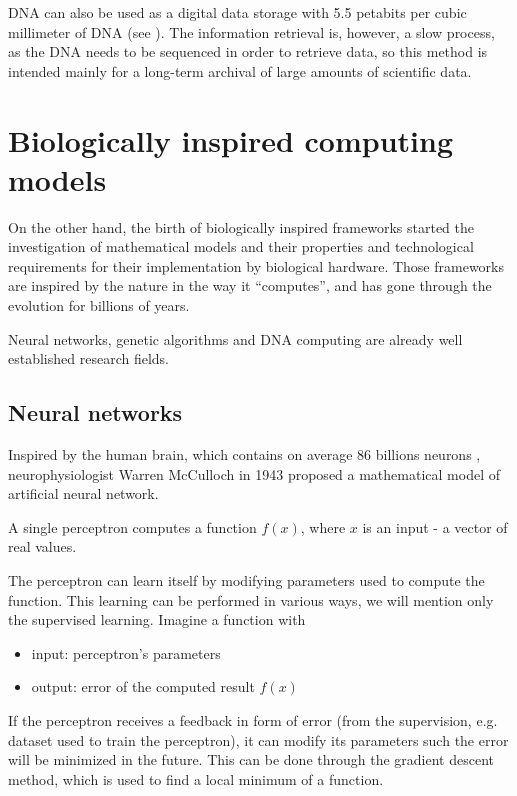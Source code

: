 DNA can also be used as a digital data storage with 5.5 petabits per cubic millimeter of DNA (see \cite{Church2012DNAStorage}). The information retrieval is, however, a slow process, as the DNA needs to be sequenced in order to retrieve data, so this method is intended mainly for a long-term archival of large amounts of scientific data.


\section{Biologically inspired computing models} %
\label{sec:biologically_inspired_computing_models}


On the other hand, the birth of biologically inspired frameworks started the investigation of mathematical models and their properties and technological requirements for their implementation by biological hardware.
Those frameworks are inspired by the nature in the way it ``computes'', and has gone through the evolution for billions of years.

Neural networks, genetic algorithms and DNA computing are already well established research fields.

\subsection{Neural networks} %
\label{sub:neural_networks}

Inspired by the human brain, which contains on average 86 billions neurons \cite{Azevedo09NumberOfNeurons}, neurophysiologist Warren McCulloch in 1943 proposed a mathematical model of artificial neural network.

A single perceptron computes a function $f(x)$, where $x$ is an input - a vector of real values.

The perceptron can learn itself by modifying parameters used to compute the function. This learning can be performed in various ways, we will mention only the supervised learning. Imagine a function with
\begin{itemize}
  \item input: perceptron's parameters
  \item output: error of the computed result $f(x)$
\end{itemize}
If the perceptron receives a feedback in form of error (from the supervision, e.g. dataset used to train the perceptron), it can modify its parameters such the error will be minimized in the future. This can be done through the gradient descent method, which is used to find a local minimum of a function.

